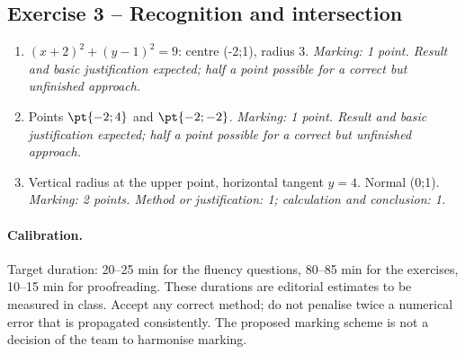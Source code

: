 \subsection*{Exercise 3 -- Recognition and intersection}
\begin{enumerate}
\item $(x+2)^2+(y-1)^2=9$: centre (-2;1), radius 3. \textit{Marking: 1 point. Result and basic justification expected; half a point possible for a correct but unfinished approach.}
\item Points $\pt{-2;4}$ and $\pt{-2;-2}$. \textit{Marking: 1 point. Result and basic justification expected; half a point possible for a correct but unfinished approach.}
\item Vertical radius at the upper point, horizontal tangent $y=4$. Normal (0;1). \textit{Marking: 2 points. Method or justification: 1; calculation and conclusion: 1.}
\end{enumerate}
\paragraph{Calibration.} Target duration: 20--25 min for the fluency questions, 80--85 min for the exercises, 10--15 min for proofreading. These durations are editorial estimates to be measured in class. Accept any correct method; do not penalise twice a numerical error that is propagated consistently. The proposed marking scheme is not a decision of the team to harmonise marking.

